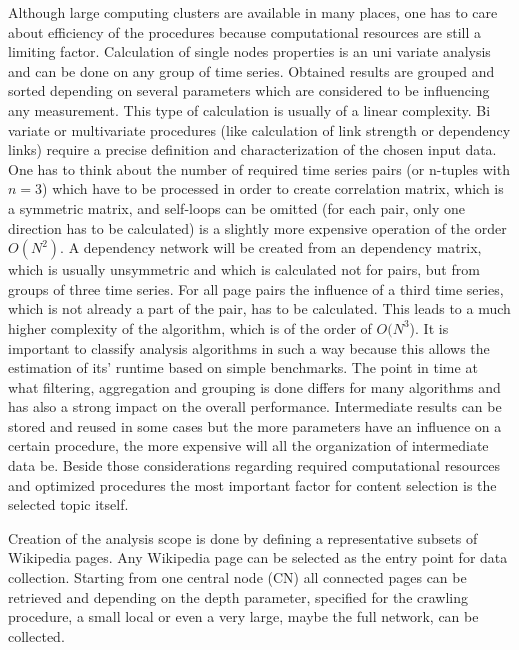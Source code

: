 \documentclass[a4paper,10pt]{scrbook}
\begin{document}
	Although large computing clusters are available in many places, one has to care about efficiency of the procedures because computational resources are still a limiting factor. Calculation of single nodes properties is an uni variate analysis and can be done on any group of time series. Obtained results are grouped and sorted depending on several parameters which are considered to be influencing any measurement. This type of calculation is usually of a linear complexity. Bi variate or multivariate procedures (like calculation of link strength or dependency links) require a precise definition and characterization of the chosen input data. One has to think about the number of required time series pairs (or n-tuples with $n=3$) which have to be processed in order to create correlation matrix, which is a symmetric matrix, and self-loops can be omitted (for each pair, only one direction has to be calculated) is a slightly more expensive operation of the order $O(N^2)$. A dependency network will be created from an dependency matrix, which is usually unsymmetric and which is calculated not for pairs, but from groups of three time series. For all page pairs the influence of a third time series, which is not already a part of the pair, has to be calculated. This leads to a much higher complexity of the algorithm, which is of the order of $O(N^3$). It is important to classify analysis algorithms in such a way because this allows the estimation of its' runtime based on simple benchmarks. The point in time at what filtering, aggregation and grouping is done differs for many algorithms and has also a strong impact on the overall performance. Intermediate results can be stored and reused in some cases but the more parameters have an influence on a certain procedure, the more expensive will all the organization of intermediate data be. Beside those considerations regarding required computational resources and optimized procedures the most important factor for content selection is the selected topic itself. 
	
Creation of the analysis scope is done by defining a representative subsets of Wikipedia pages. Any Wikipedia page can be selected as the entry point for data collection. Starting from one central node (CN) all connected pages can be retrieved and depending on the depth parameter, specified for the crawling procedure, a small local or even a very large, maybe the full network, can be collected.

%
\end{document}
